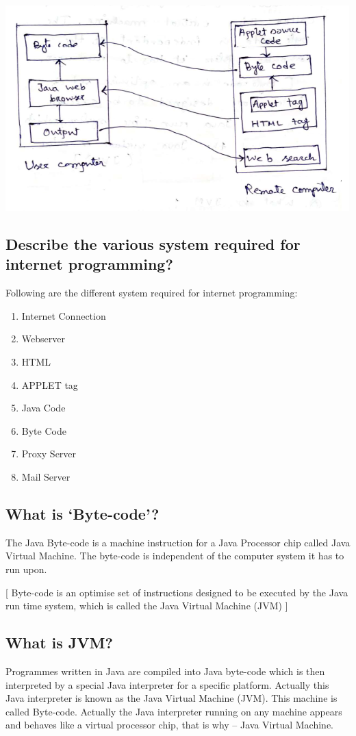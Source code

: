 \documentclass[11pt, a4paper]{book}
\begin{document}
    \includegraphics{q5diagram}
      
    \subsection{Describe the various system required for internet programming?}
      Following are the different system required for internet programming:
  
      \begin{enumerate}
  
        \item Internet Connection
        \item Webserver
        \item HTML
        \item APPLET tag
        \item Java Code
        \item Byte Code
        \item Proxy Server
        \item Mail Server
  
      \end{enumerate}
    
    \subsection{What is `Byte-code'?}
      The Java Byte-code is a machine instruction for a Java Processor chip called Java Virtual Machine. The byte-code is independent of the computer system it has to run upon.
    
      [ Byte-code is an optimise set of instructions designed to be executed by the Java run time system, which is called the Java Virtual Machine (JVM) ]
    
    \subsection{What is JVM?}
      Programmes written in Java are compiled into Java byte-code which is then interpreted by a special Java interpreter for a specific platform. Actually this Java interpreter is known as the Java Virtual Machine (JVM). This machine is called Byte-code. Actually the Java interpreter running on any
      machine appears and behaves like a virtual processor chip, that is why -- Java Virtual Machine.
    
\end{document}
